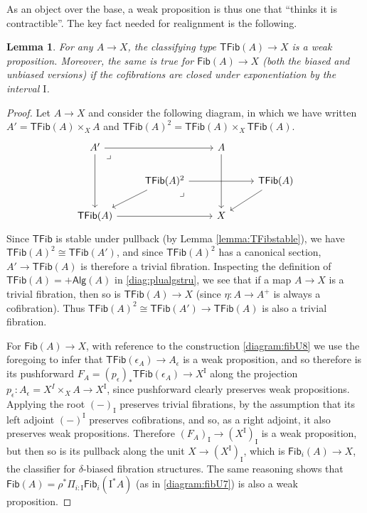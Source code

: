 \documentclass[11pt]{amsart}
\newcommand{\cof}{\ensuremath{\rightarrowtail}}
\renewcommand{\to}{\ensuremath{\rightarrow}}
\newcommand{\I}{\ensuremath{\mathrm{I}}}
\newcommand{\Fib}{\ensuremath{\mathsf{Fib}}}
\newcommand{\TFib}{\ensuremath{\mathsf{TFib}}}
\newtheorem{lemma}[theorem]{Lemma}
\theoremstyle{remark}
\theoremstyle{definition}
\newcommand{\pbmark}{\ar[dr, phantom, "\lrcorner" very near start, shift right=.5ex]}	%
\begin{document}
As an object over the base, a weak proposition is thus one that ``thinks it is contractible''.  The key fact needed for realignment is the following.

\begin{lemma}\label{lemma:Fibweakprop} For any $A\to X$, the classifying type $\TFib(A) \to X$ is a weak proposition.  Moreover, the same is true for $\Fib(A)\to X$ (both the biased and unbiased versions) if the cofibrations are closed under exponentiation by the interval $\I$.
\end{lemma}
%
%
\begin{proof}
Let $A\to X$ and consider the following diagram, in which we have written $A' = \TFib(A)\times_X A$ and $\TFib(A)^2 = \TFib(A)\times_X \TFib(A)$.
%
\begin{equation}\label{diagram:TFibweakprop}
\begin{tikzcd}
A' \ar[dd]  \ar[rr] \pbmark && A \ar[dd]  \\
& \TFib(A)^2 \ar[ld] \ar[rr]  \pbmark && \TFib(A) \ar[ld] \\
\TFib(A) \ar[rr] && X
\end{tikzcd}
\end{equation}
Since $\TFib$ is stable under pullback (by Lemma \ref{lemma:TFibstable}), we have $\TFib(A)^2 \cong \TFib(A')$, and since $\TFib(A)^2$ has a canonical section, $A' \to \TFib(A)$ is therefore a trivial fibration.  Inspecting the definition of $\TFib(A) = +\mathsf{Alg}(A)$ in \eqref{diag:plualgstru}, we see that if a map $A\to X$ is a trivial fibration, then so is $\TFib(A)\to X$ (since $\eta : A\to A^+$ is always a cofibration). Thus $\TFib(A)^2 \cong \TFib(A') \to\TFib(A)$ is also a trivial fibration.

For $\Fib(A)\to X$, with reference to the construction \eqref{diagram:fibU8} we use the foregoing to infer that $\TFib(\epsilon_A) \to A_\epsilon$ is a weak proposition, and so therefore is its pushforward $F_A = (p_\epsilon)_*\TFib(\epsilon_A)\to X^\I$ along the projection $p_\epsilon : A_\epsilon = X^I\times_X A \to X^\I$, since pushforward clearly preserves weak propositions.  Applying the root $(-)_\I$ preserves trivial fibrations, by the assumption that its left adjoint $(-)^\I$ preserves cofibrations, and so, as a right adjoint, it also preserves weak propositions. Therefore $(F_A)_\I \to (X^\I)_\I$ is a weak proposition, but then so is its pullback along the unit $X\to (X^\I)_\I$, which is $\Fib_i(A)\to X$, the classifier for $\delta$-biased fibration structures.  The same reasoning shows that $\Fib(A) = \rho^*\Pi_{i:\I}\Fib_i(\I^*A)$ (as in \eqref{diagram:fibU7}) is also a weak proposition.
\end{proof}
\end{document}
